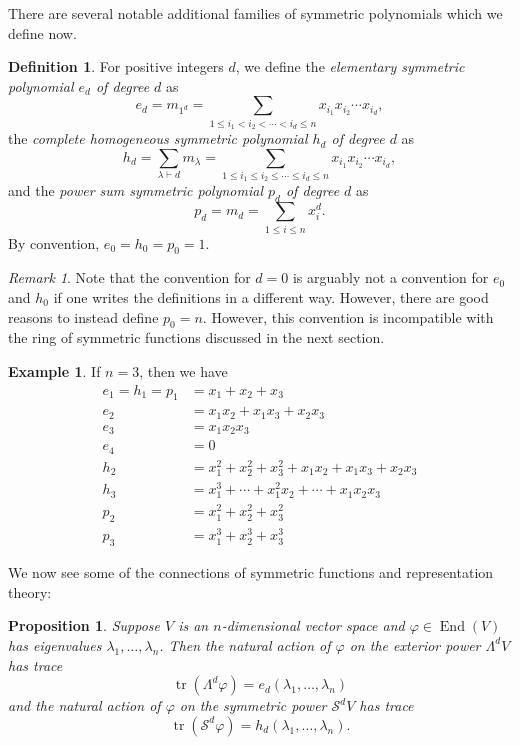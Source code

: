 \documentclass[12pt]{article}
\theoremstyle{plain}
\newtheorem{proposition}[theorem]{Proposition}
\theoremstyle{definition}
\newtheorem{definition}[theorem]{Definition}
\newtheorem{example}[theorem]{Example}
\theoremstyle{remark}
\newtheorem{remark}[theorem]{Remark}
\numberwithin{equation}{section}
\begin{document}
There are several notable additional families of symmetric polynomials
which we define now.

\begin{definition}
For positive integers $d$, we define
the \emph{elementary symmetric polynomial $e_d$ of degree $d$} as
\[
e_d = m_{1^d} = \sum_{1 \le i_1 < i_2 < \cdots < i_d \le n} x_{i_1}x_{i_2}\cdots
x_{i_d},
\]
the \emph{complete homogeneous symmetric polynomial $h_d$ of degree $d$} as
\[
h_d = \sum_{\lambda \vdash d} m_\lambda = \sum_{1 \le i_1 \le i_2 \le \cdots \le i_d \le n} x_{i_1}x_{i_2}\cdots
x_{i_d},
\]
and the \emph{power sum symmetric polynomial $p_d$ of degree $d$} as
\[
p_d = m_d = \sum_{1 \le i \le n} x_i^d.
\]
By convention, $e_0=h_0=p_0=1$.
\end{definition}

\begin{remark}
Note that the convention for $d=0$ is arguably not a convention
for $e_0$ and $h_0$ if one writes the definitions in a different way.
However, there are good reasons to instead define $p_0=n$.
However, this convention is incompatible with the ring of symmetric functions
discussed in the next section. 
\end{remark}

\begin{example}
If $n=3$, then we have
\begin{align*}
e_1 = h_1 = p_1 &= x_1 + x_2 + x_3\\
e_2 &= x_1x_2 + x_1x_3 + x_2x_3\\
e_3 &= x_1x_2x_3 \\
e_4 &= 0 \\
h_2 &= x_1^2 + x_2^2 + x_3^2 + x_1x_2 + x_1x_3 + x_2x_3\\
h_3 &= x_1^3 + \cdots + x_1^2x_2 + \cdots + x_1x_2x_3\\
p_2 &= x_1^2 + x_2^2 + x_3^2\\
p_3 &= x_1^3 + x_2^3 + x_3^3
\end{align*}
\end{example}

We now see some of the connections of symmetric functions and
representation theory:

\begin{proposition}
Suppose $V$ is an $n$-dimensional vector space and
$\varphi \in \operatorname{End}(V)$ has eigenvalues
$\lambda_1,\ldots,\lambda_n$.
Then the natural action of $\varphi$ on the exterior power $\Lambda^d V$
has trace
\[
\operatorname{tr}\left( \Lambda^d \varphi \right)
= e_d(\lambda_1,\ldots,\lambda_n)
\]
and the natural action of $\varphi$ on the symmetric power
$\mathcal{S}^d V$ has trace
\[
\operatorname{tr}\left( \mathcal{S}^d \varphi \right)
= h_d(\lambda_1,\ldots,\lambda_n).
\]
\end{proposition}
\end{document}
